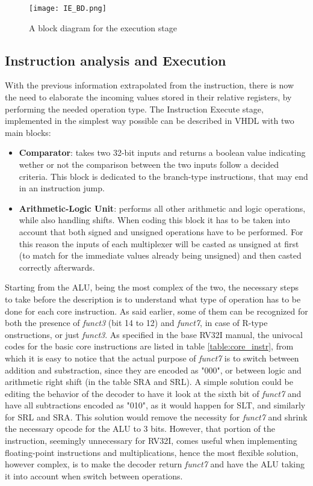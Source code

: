 \begin{figure}[ht]
    \centering
    \texttt{[image: IE\_BD.png]}
    \caption{A block diagram for the execution stage}
    \label{fig:IE_BD}
\end{figure}

\subsection{Instruction analysis and Execution}
With the previous information extrapolated from the instruction, there is now the need to elaborate the incoming values stored in their relative registers, by performing the needed operation type.
The Instruction Execute stage, implemented in the simplest way possible can be described in VHDL with two main blocks:
\begin{itemize}
\item \textbf{Comparator}: takes two 32-bit inputs and returns a boolean value indicating wether or not the comparison between the two inputs follow a decided criteria. This block is dedicated to the branch-type instructions, that may end in an instruction jump.
\item \textbf{Arithmetic-Logic Unit}: performs all other arithmetic and logic operations, while also handling shifts. When coding this block it has to be taken into account that both signed and unsigned operations have to be performed. For this reason the inputs of each multiplexer will be casted as unsigned at first (to match for the immediate values already being unsigned) and then casted correctly afterwards. 
\end{itemize}
Starting from the ALU, being the most complex of the two, the necessary steps to take before the description is to understand what type of operation has to be done for each core instruction. As said earlier, some of them can be recognized for both the presence of \emph{funct3} (bit 14 to 12) and \emph{funct7}, in case of R-type onstructions, or just \emph{funct3}. As specified in the base RV32I manual, the univocal codes for the basic core instructions are listed in table \ref{table:core_instr}, from which it is easy to notice that the actual purpose of \emph{funct7} is to switch between addition and substraction, since they are encoded as "000", or between logic and arithmetic right shift (in the table SRA and SRL). A simple solution could be editing the behavior of the decoder to have it look at the sixth bit of \emph{funct7} and have all subtractions encoded as "010", as it would happen for SLT, and similarly for SRL and SRA. This solution would remove the necessity for \emph{funct7} and shrink the necessary opcode for the ALU to 3 bits. However, that portion of the instruction, seemingly unnecessary for RV32I, comes useful when implementing floating-point instructions and multiplications, hence the most flexible solution, however complex, is to make the decoder return \emph{funct7} and have the ALU taking it into account when switch between operations.
